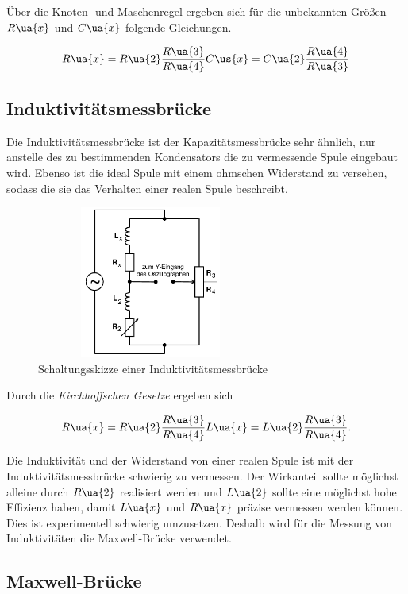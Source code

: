Über die Knoten- und Maschenregel ergeben sich für die unbekannten Größen
$R\ua{x}$ und $C\ua{x}$ folgende Gleichungen.

\begin{equation}
  R\ua{x} = R\ua{2}\frac{R\ua{3}}{R\ua{4}}
  C\us{x} = C\ua{2}\frac{R\ua{4}}{R\ua{3}}
\end{equation}

\subsection{Induktivitätsmessbrücke}

Die Induktivitätsmessbrücke ist der Kapazitätsmessbrücke sehr ähnlich, nur anstelle
des zu bestimmenden Kondensators die zu vermessende Spule eingebaut wird.
Ebenso ist die ideal Spule mit einem ohmschen Widerstand zu versehen, sodass
die sie das Verhalten einer realen Spule beschreibt.
\begin{figure}
  \includegraphics[width=7.50cm, height=5cm]{V302_Induktivitätsmessbrücke}
  \caption{Schaltungsskizze einer Induktivitätsmessbrücke}
  \label{fig:Induktivitätsmessbrücke}
\end{figure}

Durch die \emph{Kirchhoffschen Gesetze} ergeben sich

\begin{equation}
  R\ua{x} = R\ua{2}\frac{R\ua{3}}{R\ua{4}}
  L\ua{x} = L\ua{2}\frac{R\ua{3}}{R\ua{4}}.
\end{equation}

Die Induktivität und der Widerstand von einer realen Spule ist mit der
Induktivitätsmessbrücke schwierig zu vermessen. Der Wirkanteil sollte
möglichst alleine durch $R\ua{2}$ realisiert werden und $L\ua{2}$ sollte
eine möglichst hohe Effizienz haben, damit $L\ua{x}$ und $R\ua{x}$ präzise vermessen
werden können. Dies ist experimentell schwierig umzusetzen.
Deshalb wird für die Messung von Induktivitäten die Maxwell-Brücke verwendet.

\subsection{Maxwell-Brücke}




